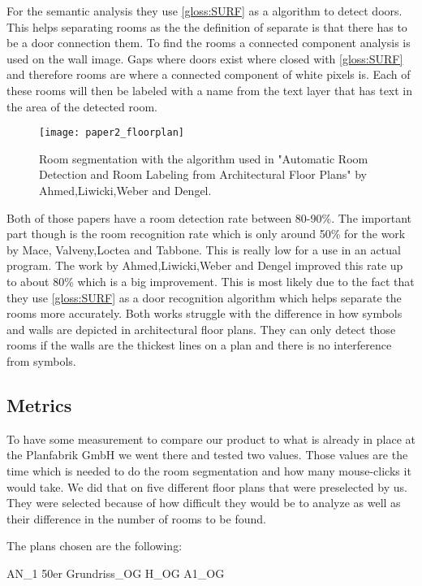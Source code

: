 For the semantic analysis they use \ref{gloss:SURF} as a algorithm to detect doors. This helps separating rooms as the the definition of separate is that there has to be a door connection them. To find the rooms a connected component analysis is used on the wall image. Gaps where doors exist where closed with \ref{gloss:SURF} and therefore rooms are where a connected component of white pixels is. Each of these rooms will then be labeled with a name from the text layer that has text in the area of the detected room.

\begin{figure}[h]
	\centering
	\texttt{[image: paper2\_floorplan]}
	\caption{Room segmentation with the algorithm used in "Automatic Room Detection and Room Labeling from Architectural Floor Plans" by Ahmed,Liwicki,Weber and Dengel. }
	\label{fig:paper2_floorplan}
\end{figure}

Both of those papers have a room detection rate between 80-90\%. The important part though is the room recognition rate which is only around 50\% for the work by Mace, Valveny,Loctea and Tabbone. This is really low for a use in an actual program. The work by Ahmed,Liwicki,Weber and Dengel improved this rate up to about 80\% which is a big improvement. This is most likely due to the fact that they use \ref{gloss:SURF} as a door recognition algorithm which helps separate the rooms more accurately. Both works struggle with the difference in how symbols and walls are depicted in architectural floor plans. They can only detect those rooms if the walls are the thickest lines on a plan and there is no interference from symbols.

 

\subsection{Metrics}
To have some measurement to compare our product to what is already in place at the Planfabrik GmbH we went there and tested two values. Those values are the time which is needed to do the room segmentation and how many mouse-clicks it would take. We did that on five different floor plans that were preselected by us. They were selected because of how difficult they would be to analyze as well as their difference in the number of rooms to be found.

The plans chosen are the following:

AN\_1
50er
Grundriss\_OG
H\_OG
A1\_OG

